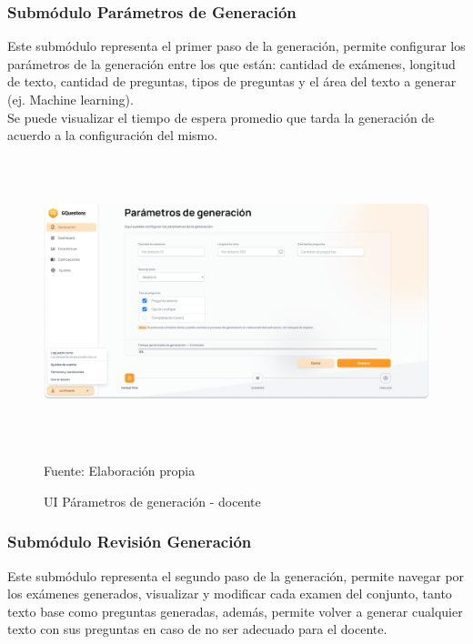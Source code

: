 \documentclass[../Main.tex]{subfiles}
\begin{document}
    \subsubsection{Submódulo Parámetros de Generación}
    \begin{justify}
    Este submódulo representa el primer paso de la generación, permite configurar los parámetros de la generación entre los que están: cantidad de exámenes, longitud de texto, cantidad de preguntas, tipos de preguntas y el área del texto a generar (ej. Machine learning).\\
    Se puede visualizar el tiempo de espera promedio que tarda la generación de acuerdo a la configuración del mismo.
    \end{justify}
    
    \begin{figure}[H]
	\begin{Center}
		\includegraphics[width=6.4in,height=3.3in]{Images/ui_docente_generacion.png}
	    \caption{UI Párametros de generación - docente}
	    Fuente: Elaboración propia
        \label{fig:section}
	\end{Center}
    \end{figure}
    
    \subsubsection{Submódulo Revisión Generación}
    \begin{justify}
    Este submódulo representa el segundo paso de la generación, permite navegar por los exámenes generados, visualizar y modificar cada examen del conjunto, tanto texto base como preguntas generadas, además, permite volver a generar cualquier texto con sus preguntas en caso de no ser adecuado para el docente.
    \end{justify}
    
\end{document}
